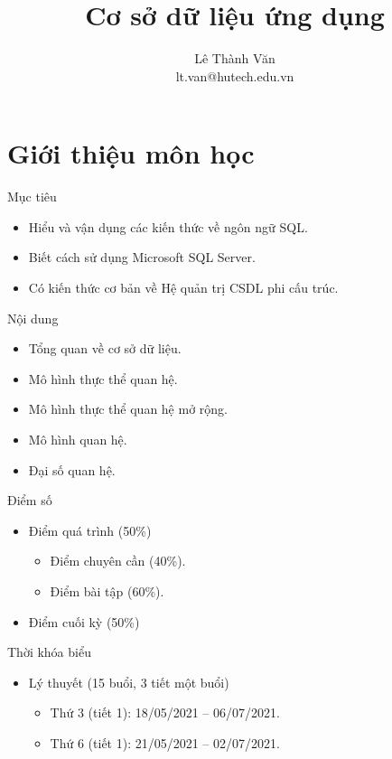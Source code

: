 \documentclass[11pt]{beamer}
\author{Lê Thành Văn \texorpdfstring{\\ \footnotesize lt.van@hutech.edu.vn}{}}
\title{Cơ sở dữ liệu ứng dụng}
\date{}
\institute{Khoa Hệ thống thông tin quản lý}
\begin{document}
    \begin{frame}
        \titlepage
    \end{frame}

    \section{Giới thiệu môn học}
    \begin{frame}{Mục tiêu}
        \begin{itemize}
            \item Hiểu và vận dụng các kiến thức về ngôn ngữ SQL.
            \item Biết cách sử dụng Microsoft SQL Server.
            \item Có kiến thức cơ bản về Hệ quản trị CSDL phi cấu trúc.
        \end{itemize}
    \end{frame}

    \begin{frame}{Nội dung}
        \begin{itemize}
            \item Tổng quan về cơ sở dữ liệu.
            \item Mô hình thực thể quan hệ.
            \item Mô hình thực thể quan hệ mở rộng.
            \item Mô hình quan hệ.
            \item Đại số quan hệ.
        \end{itemize}
    \end{frame}

    \begin{frame}{Điểm số}
        \begin{itemize}
            \item Điểm quá trình (50\%)
            \begin{itemize}
                \item Điểm chuyên cần (40\%).
                \item Điểm bài tập (60\%).
            \end{itemize}
            \item Điểm cuối kỳ (50\%)
        \end{itemize}
    \end{frame}

    \begin{frame}{Thời khóa biểu}
        \begin{itemize}
            \item Lý thuyết (15 buổi, 3 tiết một buổi)
            \begin{itemize}
                \item Thứ 3 (tiết 1): 18/05/2021 -- 06/07/2021.
                \item Thứ 6 (tiết 1): 21/05/2021 -- 02/07/2021.
            \end{itemize}
        \end{itemize}
    \end{frame}
\end{document}
